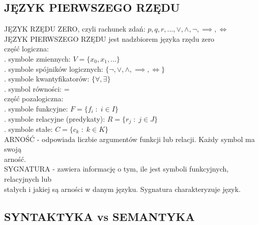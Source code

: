 \documentclass{article}
\begin{document}
\subsection{JĘZYK PIERWSZEGO RZĘDU}
{\color{emp}JĘZYK RZĘDU ZERO}, czyli rachunek zdań: $p, q, r, ..., \lor, \land, \neg, \implies, \iff$\bigskip\\
{\color{emp}JĘZYK PIERWSZEGO RZĘDU} jest nadzbiorem języka rzędu zero\medskip\\
{\color{acc}część logiczna:}\smallskip\\
    . symbole zmiennych: $V=\{x_0, x_1, ...\}$\\
    . symbole spójników logicznych: $\{\neg, \lor, \land, \implies, \iff\}$\\
    . symbole kwantyfikatorów: $\{\forall, \exists\}$\\
    . symbol równości: =\medskip\\
{\color{acc}część pozalogiczna:}\smallskip\\
    . symbole funkcyjne: $F=\{f_i\;:\;i\in I\}$\\
    . symbole relacyjne (predykaty): $R=\{r_j\;:\;j\in J\}$\\
    . symbole stałe: $C=\{c_k\;:\; k\in K\}$\medskip\\
{\color{def}ARNOŚĆ} - odpowiada liczbie argumentów funkcji lub relacji. Każdy symbol ma swoją \\arność.\smallskip\\
{\color{def}SYGNATURA} - zawiera informację o tym, ile jest symboli funkcyjnych, relacyjnych lub \\stałych i jakiej są arności w danym języku. Sygnatura charakteryzuje język.

\subsection{SYNTAKTYKA vs SEMANTYKA}
\end{document}
